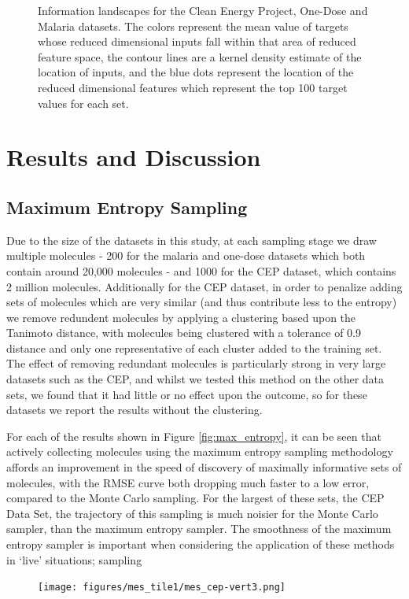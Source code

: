 \documentclass{pnastwo}
\begin{document}
\begin{article}
\begin{figure}[htb]
\caption{Information landscapes for the Clean Energy Project, One-Dose and Malaria datasets.  The colors represent the mean value of targets whose reduced dimensional inputs fall within that area of reduced feature space, the contour lines are a kernel density estimate of the location of inputs, and the blue dots represent the location of the reduced dimensional features which represent the top 100 target values for each set.}
\label{fig:info_landscapes}
\end{figure}

\section{Results and Discussion}
\subsection{Maximum Entropy Sampling}

Due to the size of the datasets in this study, at each sampling stage we draw multiple molecules - 200 for the malaria and one-dose datasets which both contain around 20,000 molecules - and 1000 for the CEP dataset, which contains 2 million molecules. Additionally for the CEP dataset, in order to penalize adding sets of molecules which are very similar (and thus contribute less to the entropy) we remove redundent molecules by applying a clustering based upon the Tanimoto distance, with molecules being clustered with a tolerance of 0.9 distance and only one representative of each cluster added to the training set.  The effect of removing redundant molecules is particularly strong in very large datasets such as the CEP, and whilst we tested this method on the other data sets, we found that it had little or no effect upon the outcome, so for these datasets we report the results without the clustering.


For each of the results shown in Figure \ref{fig:max_entropy}, it can be seen that actively collecting molecules using the maximum entropy sampling methodology affords an improvement in the speed of discovery of maximally informative sets of molecules, with the RMSE curve both dropping much faster to a low error, compared to the Monte Carlo sampling.  For the largest of these sets, the CEP Data Set, the trajectory of this sampling is much noisier for the Monte Carlo sampler, than the maximum entropy sampler.  The smoothness of the maximum entropy sampler is important when considering the application of these methods in `live' situations; sampling 
\begin{figure}[ht]
\centering
\texttt{[image: figures/mes\_tile1/mes\_cep-vert3.png]}


\end{figure}
\end{article}
\end{document}
